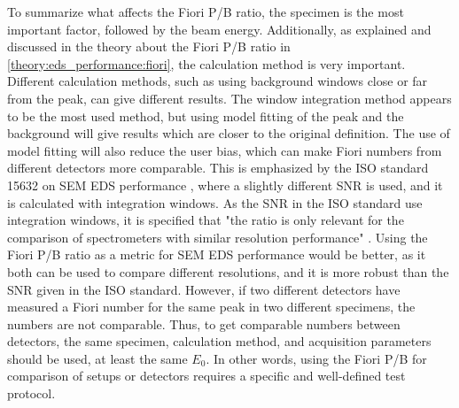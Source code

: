 To summarize what affects the Fiori P/B ratio, the specimen is the most important factor, followed by the beam energy.
Additionally, as explained and discussed in the theory about the Fiori P/B ratio in \cref{theory:eds_performance:fiori}, the calculation method is very important.
Different calculation methods, such as using background windows close or far from the peak, can give different results.
The window integration method appears to be the most used method, but using model fitting of the peak and the background will give results which are closer to the original definition.
The use of model fitting will also reduce the user bias, which can make Fiori numbers from different detectors more comparable.
This is emphasized by the ISO standard 15632 on SEM EDS performance \cite{iso_qc_15632}, where a slightly different SNR is used, and it is calculated with integration windows.
As the SNR in the ISO standard use integration windows, it is specified that "the ratio is only relevant for the comparison of spectrometers with similar resolution performance" \cite[p. 4]{iso_qc_15632}.
Using the Fiori P/B ratio as a metric for SEM EDS performance would be better, as it both can be used to compare different resolutions, and it is more robust than the SNR given in the ISO standard.
However, if two different detectors have measured a Fiori number for the same peak in two different specimens, the numbers are not comparable.
Thus, to get comparable numbers between detectors, the same specimen, calculation method, and acquisition parameters should be used, at least the same $E_0$.
In other words, using the Fiori P/B for comparison of setups or detectors requires a specific and well-defined test protocol.



